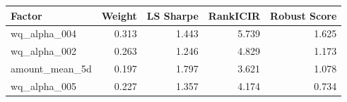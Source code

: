 \begin{tabular}{lrrrr}
\toprule
Factor & Weight & LS Sharpe & RankICIR & Robust Score \\
\midrule
wq\_alpha\_004 & 0.313 & 1.443 & 5.739 & 1.625 \\
wq\_alpha\_002 & 0.263 & 1.246 & 4.829 & 1.173 \\
amount\_mean\_5d & 0.197 & 1.797 & 3.621 & 1.078 \\
wq\_alpha\_005 & 0.227 & 1.357 & 4.174 & 0.734 \\
\bottomrule
\end{tabular}
